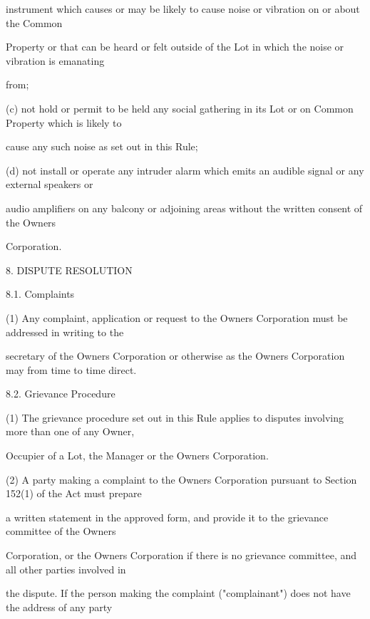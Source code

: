 \documentclass{article}
\begin{document}
{\fontsize{10.02}{1}instrument which causes or may be likely to cause noise or vibration on or about the Common }

{\fontsize{10.02}{1}Property or that can be heard or felt outside of the Lot in which the noise or vibration is emanating }

{\fontsize{10.02}{1}from; }

{\fontsize{9.962}{1}(c) not hold or permit to be held any social gathering in its Lot or on Common Property which is likely to }

{\fontsize{10.02}{1}cause any such noise as set out in this Rule; }

{\fontsize{9.962}{1}(d) not install or operate any intruder alarm which emits an audible signal or any external speakers or }

{\fontsize{10.02}{1}audio amplifiers on any balcony or adjoining areas without the written consent of the Owners }

{\fontsize{10.02}{1}Corporation. }


{\fontsize{9.99}{1}8. DISPUTE RESOLUTION }

{\fontsize{9.99}{1}8.1. Complaints }

{\fontsize{9.962}{1}(1) Any complaint, application or request to the Owners Corporation must be addressed in writing to the }

{\fontsize{10.02}{1}secretary of the Owners Corporation or otherwise as the Owners Corporation may from time to time direct. }

{\fontsize{9.99}{1}8.2. Grievance Procedure }

{\fontsize{9.962}{1}(1) The grievance procedure set out in this Rule applies to disputes involving more than one of any Owner, }

{\fontsize{10.02}{1}Occupier of a Lot, the Manager or the Owners Corporation. }

{\fontsize{9.962}{1}(2) A party making a complaint to the Owners Corporation pursuant to Section 152(1) of the Act must prepare }

{\fontsize{10.02}{1}a written statement in the approved form, and provide it to the grievance committee of the Owners }

{\fontsize{10.02}{1}Corporation, or the Owners Corporation if there is no grievance committee, and all other parties involved in }

{\fontsize{10.02}{1}the dispute. If the person making the complaint ("complainant") does not have the address of any party }
\end{document}
